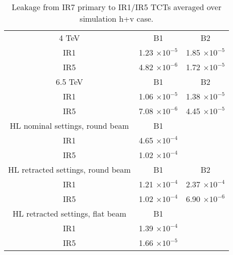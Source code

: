 \begin{table}[!h]
   \centering
   \caption{Leakage from IR7 primary to IR1/IR5 TCTs averaged over simulation h+v case.}

   \begin{tabular}{c|c|c}
       \hline
       4 TeV  & B1 & B2\\

       IR1 & 1.23 $\times 10^{-5}$ & 1.85 $\times 10^{-5}$  \\
       IR5 & 4.82 $\times 10^{-6}$ & 1.72 $\times 10^{-5}$  \\
       \hline
       6.5 TeV  & B1 & B2\\

       IR1 & 1.06 $\times 10^{-5}$ & 1.38 $\times 10^{-5}$  \\
       IR5 & 7.08 $\times 10^{-6}$ & 4.45 $\times 10^{-5}$  \\
       \hline       
       HL nominal settings, round beam  & B1 & \\ %
       
       IR1 & 4.65 $\times 10^{-4}$ &  \\ 
       IR5 & 1.02 $\times 10^{-4}$ &  \\ %
       \hline
       HL retracted settings, round beam  & B1 & B2 \\
       
       IR1 & 1.21 $\times 10^{-4}$ &  2.37 $\times 10^{-4}$ \\ %
       IR5 & 1.02 $\times 10^{-4}$ &  6.90 $\times 10^{-6}$ \\ %
       \hline

       HL retracted settings, flat beam  & B1 \\       
       IR1 & 1.39 $\times 10^{-4}$ & \\ %
       IR5 & 1.66 $\times 10^{-5}$ & \\ %
       \hline
   \end{tabular}
   \label{leakageFactorsIR7}
\end{table}


